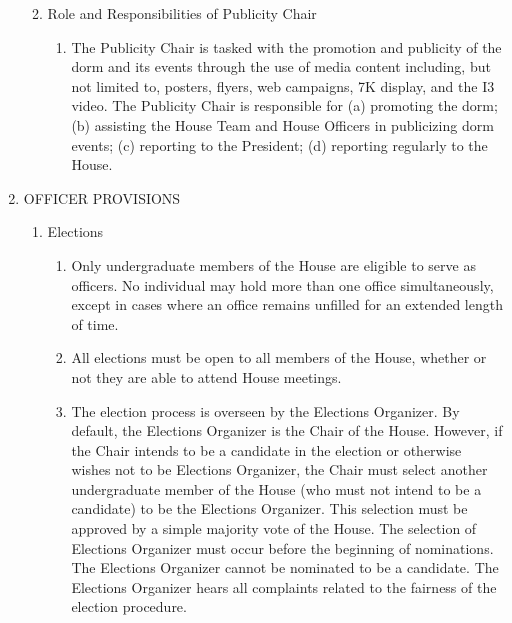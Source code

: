 \documentclass[letterpaper]{article}
\begin{document}
\begin{enumerate}
\begin{enumerate}
\begin{enumerate}
\end{enumerate}

\item Role and Responsibilities of Publicity Chair

\begin{enumerate}

\item The Publicity Chair is tasked with the promotion and publicity of the dorm and its events through the use of media content including, but not limited to, posters, flyers, web campaigns, 7K display, and the I3 video. The Publicity Chair is responsible for (a) promoting the dorm; (b) assisting the House Team and House Officers in publicizing dorm events; (c) reporting to the President; (d) reporting regularly to the House.

\end{enumerate}

\end{enumerate}

\item OFFICER PROVISIONS 

\begin{enumerate}

\item Elections 

\begin{enumerate}

\item Only undergraduate members of the House are eligible to serve as officers. No individual may hold more than one office simultaneously, except in cases where an office remains unfilled for an extended length of time.

\item All elections must be open to all members of the House, whether or not they are able to attend House meetings.

\item The election process is overseen by the Elections Organizer. By default, the Elections Organizer is the Chair of the House. However, if the Chair intends to be a candidate in the election or otherwise wishes not to be Elections Organizer, the Chair must select another undergraduate member of the House (who must not intend to be a candidate) to be the Elections Organizer. This selection must be approved by a simple majority vote of the House. The selection of Elections Organizer must occur before the beginning of nominations. The Elections Organizer cannot be nominated to be a candidate. The Elections Organizer hears all complaints related to the fairness of the election procedure.


\end{enumerate}
\end{enumerate}
\end{enumerate}
\end{document}
